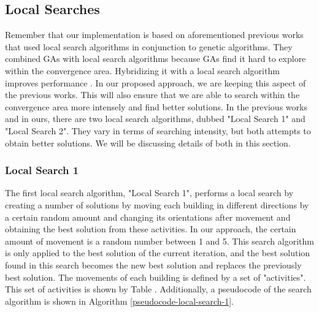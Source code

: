 \subsection{Local Searches}
Remember that our implementation is based on aforementioned previous works that used local search algorithms in conjunction to genetic algorithms. They combined GAs with local search algorithms because GAs find it hard to explore within the convergence area. Hybridizing it with a local search algorithm improves performance \cite{Ripon2013}. In our proposed approach, we are keeping this aspect of the previous works. This will also ensure that we are able to search within the convergence area more intensely and find better solutions. In the previous works and in ours, there are two local search algorithms, dubbed "Local Search 1" and "Local Search 2". They vary in terms of searching intensity, but both attempts to obtain better solutions. We will be discussing details of both in this section.

\subsubsection{Local Search 1}
The first local search algorithm, "Local Search 1", performs a local search by creating a number of solutions by moving each building in different directions by a certain random amount and changing its orientations after movement and obtaining the best solution from these activities. In our approach, the certain amount of movement is a random number between 1 and 5. This search algorithm is only applied to the best solution of the current iteration, and the best solution found in this search becomes the new best solution and replaces the previously best solution. The movements of each building is defined by a set of "activities". This set of activities is shown by Table \cite{local-search-1-activities}. Additionally, a pseudocode of the search algorithm is shown in Algorithm \ref{pseudocode-local-search-1}.

